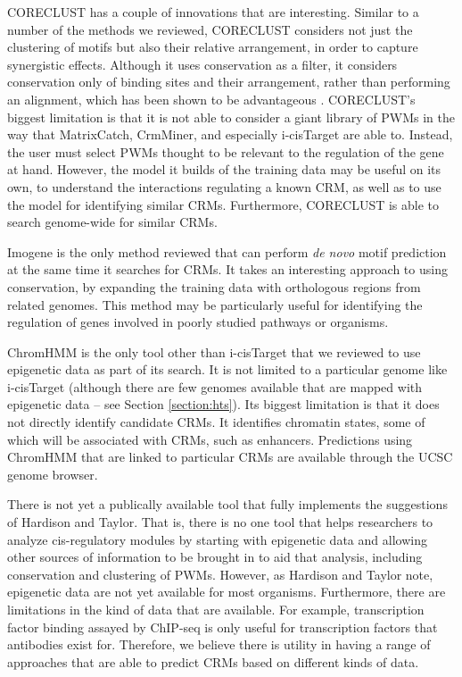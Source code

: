\documentclass{frontiersENG} %
\begin{document}
CORECLUST has a couple of innovations that are interesting. Similar to
a number of the methods we reviewed, CORECLUST considers not just the
clustering of motifs but also their relative arrangement, in order to
capture synergistic effects. Although it uses conservation as a
filter, it considers conservation only of binding sites and their
arrangement, rather than performing an alignment, which has been shown
to be advantageous \cite{Su2010}. CORECLUST's biggest limitation is
that it is not able to consider a giant library of PWMs in the way
that MatrixCatch, CrmMiner, and especially i-cisTarget are able
to. Instead, the user must select PWMs thought to be relevant to the
regulation of the gene at hand. However, the model it builds of the
training data may be useful on its own, to understand the interactions
regulating a known CRM, as well as to use the model for identifying
similar CRMs. Furthermore, CORECLUST is able to search genome-wide for
similar CRMs.

Imogene is the only method reviewed that can perform \textit{de novo}
motif prediction at the same time it searches for CRMs. It takes an
interesting approach to using conservation, by expanding the training
data with orthologous regions from related genomes. This method may be
particularly useful for identifying the regulation of genes involved
in poorly studied pathways or organisms.

ChromHMM is the only tool other than i-cisTarget that we reviewed to
use epigenetic data as part of its search. It is not limited to a
particular genome like i-cisTarget (although there are few genomes
available that are mapped with epigenetic data -- see Section
\ref{section:hts}). Its biggest limitation is that it does not
directly identify candidate CRMs. It identifies chromatin states, some
of which will be associated with CRMs, such as enhancers. Predictions
using ChromHMM that are linked to particular CRMs are available
through the UCSC genome browser. 

There is not yet a publically available tool that fully implements the
suggestions of Hardison and Taylor. That is, there is no one tool that
helps researchers to analyze cis-regulatory modules by starting with
epigenetic data and allowing other sources of information to be
brought in to aid that analysis, including conservation and clustering
of PWMs. However, as Hardison and Taylor note, epigenetic data are not
yet available for most organisms. Furthermore, there are limitations
in the kind of data that are available. For example, transcription
factor binding assayed by ChIP-seq is only useful for transcription
factors that antibodies exist for. Therefore, we believe there is
utility in having a range of approaches that are able to predict CRMs
based on different kinds of data.
\end{document}
